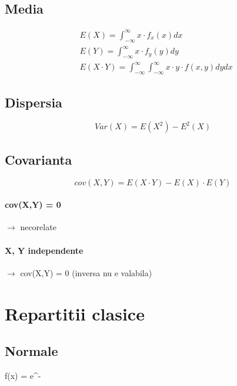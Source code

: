 \documentclass[oneside]{memoir}
\begin{document}
\subsection*{Media}
\begin{center}
    \begin{equation*}
        \begin{split}
&E(X) = \int_{-\infty}^{\infty} x \cdot f_x(x) dx \\
&E(Y) = \int_{-\infty}^{\infty} x \cdot f_y(y) dy \\
&E(X\cdot Y) = \int_{-\infty}^{\infty} \int_{-\infty}^{\infty} x\cdot y \cdot f(x,y) dy dx
        \end{split}
    \end{equation*}
\end{center}

\subsection*{Dispersia}
\begin{center}
    \begin{equation*}
Var(X) = E(X^2) - E^2(X)
    \end{equation*}
\end{center}

\subsection*{Covarianta}
\begin{center}
    \begin{equation*}
cov(X,Y) = E(X\cdot Y) - E(X) \cdot E(Y)
    \end{equation*}
\end{center}
\paragraph*{cov(X,Y) = 0} $\rightarrow$ necorelate
\paragraph*{X, Y independente} $\rightarrow$ cov(X,Y) = 0 (inversa nu e valabila)

\section[Repartitii clasice]{Repartitii clasice}
\subsection*{Normale}
\begin{center}
    \begin{myequation*}
f(x) =  \cdot e^{- }
    \end{myequation*}
\end{center}
\end{document}
